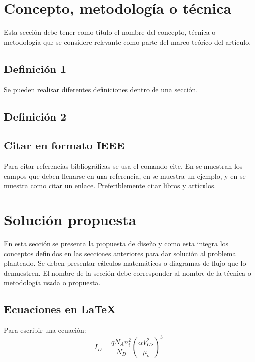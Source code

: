 \documentclass[journal]{IEEEtran}
\begin{document}
\section{Concepto, metodología o técnica}	
Esta sección debe tener como título el nombre del concepto, técnica o metodología que se considere relevante como parte del marco teórico del artículo.
\subsection{Definición 1}
Se pueden realizar diferentes definiciones dentro de una sección.

\subsection{Definición 2}

\subsection{Citar en formato IEEE}
Para citar referencias bibliográficas se usa el comando cite. En \cite{nombre_para_citar} se muestran los campos que deben llenarse en una referencia, en \cite{kopka} se muestra un ejemplo, y en \cite{link} se muestra como citar un enlace. Preferiblemente citar libros y artículos.
\section{Solución propuesta}
En esta sección se presenta la propuesta de diseño y como esta integra los conceptos definidos en las secciones anteriores para dar solución al problema planteado. Se deben presentar cálculos matemáticos o diagramas de flujo que lo demuestren. El nombre de la sección debe corresponder al nombre de la técnica o metodología usada o propuesta.

\subsection{Ecuaciones en \LaTeX}
Para escribir una ecuación:
\begin{equation}\label{eqID}
I_D=\frac{q N_A n_i^2}{N_D}\left(\frac{\alpha V_{GS}^2}{\mu_o}\right)^3
\end{equation}
\end{document}

